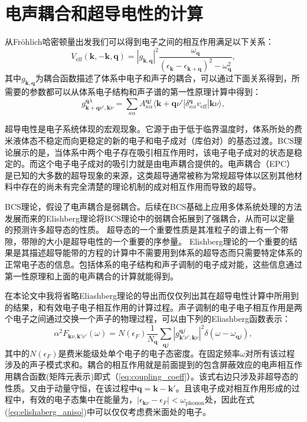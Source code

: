 \section{电声耦合和超导电性的计算}
从Fr{\"o}hlich哈密顿量\cite{frohlich1954theory}出发我们可以得到电子之间的相互作用满足以下关系：
\begin{equation}
  V_{\mathrm{eff}}(\bm{k},-\bm{k},\bm{q}) = |g_{\bm{k},\bm{q}}|^2
  \frac{\omega_{\bm{q}}}{(\epsilon_{\bm{k}}-\epsilon_{\bm{k}+\bm{q}})^2-\omega^2_{\bm{q}}} ,
\end{equation}
其中$g_{\bm{k},\bm{q}}$为耦合函数描述了体系中电子和声子的耦合，可以通过下面关系得到，所需要的参数都可以从体系电子结构和声子谱的第一性原理计算中得到：
\begin{equation}\label{eq:coupling_coeff}
  g^{\bm{q}\lambda}_{\bm{k}+\bm{q}\nu',\bm{k}\nu} =
  \sum_{\kappa\alpha} A^{\bm{q}j}_{\kappa\alpha}
  \langle {\bm{k}+\bm{q}\nu'} | {\delta^{\bm{q}}_{\kappa\alpha}v_{\mathrm{eff}}} | {\bm{k}\nu} \rangle ,
\end{equation}

超导电性是电子系统体现的宏观现象。它源于由于低于临界温度时，体系所处的费米液体态不稳定而向更稳定的新的电子和电子成对（库伯对）的基态过渡。BCS理论\cite{bardeen1957theory}展示的是，当体系中两个电子存在吸引相互作用时，该电子电子成对的状态是稳定的。而这个电子电子成对的吸引力就是由电声耦合提供的。电声耦合（EPC）是已知的大多数的超导现象的来源，这类超导通常被称为常规超导体以区别其他材料中存在的尚未有完全清楚的理论机制的成对相互作用而导致的超导。

BCS理论，假设了电声耦合是弱耦合。后续在BCS基础上应用多体系统处理的方法\cite{scalapino1969electron}发展而来的Elishberg理论\cite{eliashberg1960interactions}将BCS理论中的弱耦合拓展到了强耦合，从而可以定量的预测许多超导态的性质。
超导态的一个重要性质是其准粒子的谱上有一个带隙，带隙的大小是超导电性的一个重要的序参量。
Elishberg理论的一个重要的结果是其描述超导能带的方程的计算中不需要用到体系的超导态而只需要特定体系的正常电子态的信息。包括体系的电子结构和声子调制的电子成对能，这些信息通过第一性原理和上面的电声耦合的计算就能得到。

在本论文中我将省略Eliashberg理论的导出而仅仅列出其在超导电性计算中所用到的结果，和有效电子电子相互作用的计算过程。声子调制的电子电子相互作用是两个电子之间通过交换一个声子的物理过程，可以由下列的Eliashberg函数表示：
\begin{equation}\label{eq:elishaberg_aniso}
  \alpha^2 F_{\bm{k}\nu,\bm{k}'\nu'}(\omega) =
  N(\epsilon_F) \frac{1}{N_{\bm{q}}} \sum_{\bm{q}j}
  |g^{\bm{q}j}_{\bm{k}'\nu',\bm{k}\nu}|^2 \delta(\omega-\omega_{\bm{q}j}) ,
\end{equation}
其中的$N(\epsilon_F)$是费米能级处单个电子的电子态密度。在固定频率$\omega$对所有该过程涉及的声子模式求和。耦合的相互作用就是前面提到的包含屏蔽效应的电声相互作用耦合函数(矩阵元表示)即式（\ref{eq:coupling_coeff}）。该式右边只涉及非超导态的性质。又由于动量守恒，在该过程中$\bm{q}=\bm{k}-\bm{k}'$。且该电子成对相互作用形成的过程中，有效的电子态集中在能量为，$|\epsilon_{\bm{k}\nu}-\epsilon_F|<\omega_{\mathrm{phonon}}$处，因此在式(\ref{eq:elishaberg_aniso})中可以仅仅考虑费米面处的电子\cite{allen1983theory}。


